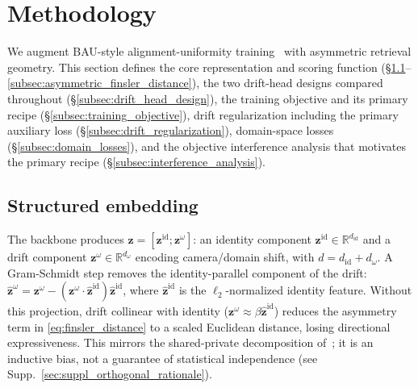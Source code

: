 \section{Methodology} \label{sec:methodology}
We augment BAU-style alignment-uniformity training~\cite{cho2024generalizable} with asymmetric retrieval geometry. This section defines the core representation and scoring function (\S\ref{subsec:structured_embedding}--\ref{subsec:asymmetric_finsler_distance}), the two drift-head designs compared throughout (\S\ref{subsec:drift_head_design}), the training objective and its primary recipe (\S\ref{subsec:training_objective}), drift regularization including the primary auxiliary loss (\S\ref{subsec:drift_regularization}), domain-space losses (\S\ref{subsec:domain_losses}), and the objective interference analysis that motivates the primary recipe (\S\ref{subsec:interference_analysis}).

\subsection{Structured embedding} \label{subsec:structured_embedding}
The backbone produces $\mathbf{z}=[\mathbf{z}^{\mathrm{id}};\mathbf{z}^{\omega}]$: an identity component $\mathbf{z}^{\mathrm{id}}\in\mathbb{R}^{d_{\mathrm{id}}}$ and a drift component $\mathbf{z}^{\omega}\in\mathbb{R}^{d_\omega}$ encoding camera/domain shift, with $d=d_{\mathrm{id}}+d_\omega$. A Gram-Schmidt step removes the identity-parallel component of the drift: $\hat{\mathbf{z}}^{\omega}=\mathbf{z}^{\omega}-(\mathbf{z}^{\omega}\cdot\hat{\mathbf{z}}^{\mathrm{id}})\hat{\mathbf{z}}^{\mathrm{id}}$, where $\hat{\mathbf{z}}^{\mathrm{id}}$ is the $\ell_2$-normalized identity feature. Without this projection, drift collinear with identity ($\mathbf{z}^{\omega}\approx\beta\hat{\mathbf{z}}^{\mathrm{id}}$) reduces the asymmetry term in \eqref{eq:finsler_distance} to a scaled Euclidean distance, losing directional expressiveness. This mirrors the shared-private decomposition of~\cite{bousmalis2016domain}; it is an inductive bias, not a guarantee of statistical independence (see Supp.~\ref{sec:suppl_orthogonal_rationale}).

